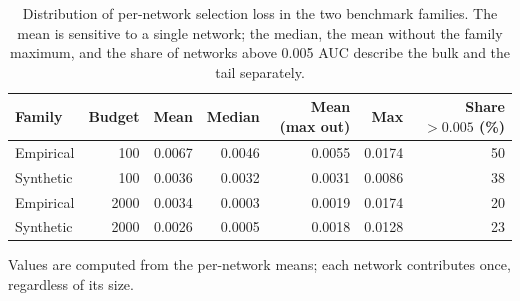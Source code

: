 \begin{table}[htbp]
\centering
\footnotesize
\setlength{\tabcolsep}{5pt}
\caption{Distribution of per-network selection loss in the two benchmark families. The mean is sensitive to a single network; the median, the mean without the family maximum, and the share of networks above 0.005 AUC describe the bulk and the tail separately.}
\label{tab:familyrobust}
\begin{tabular}{l r r r r r r}
\toprule
Family & Budget & Mean & Median & Mean (max out) & Max & Share $>0.005$ (\%) \\
\midrule
Empirical & 100 & 0.0067 & 0.0046 & 0.0055 & 0.0174 & 50 \\
Synthetic & 100 & 0.0036 & 0.0032 & 0.0031 & 0.0086 & 38 \\
Empirical & 2000 & 0.0034 & 0.0003 & 0.0019 & 0.0174 & 20 \\
Synthetic & 2000 & 0.0026 & 0.0005 & 0.0018 & 0.0128 & 23 \\
\bottomrule
\end{tabular}
\par\vspace{2pt}\begin{minipage}{\linewidth}\footnotesize Values are computed from the per-network means; each network contributes once, regardless of its size.\end{minipage}
\end{table}
